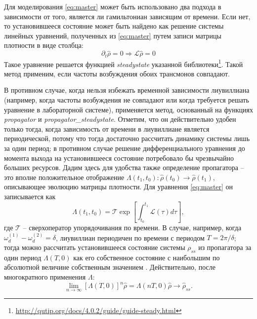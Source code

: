 \documentclass[14pt, a4paper]{extreport}
\numberwithin{equation}{section}
\begin{document}
Для моделирования \eqref{eq:master} может быть использовано два подхода в зависимости от того, является ли гамильтониан зависящим от времени. Если нет, то установившееся состояние может быть найдено как решение системы линейных уравнений, полученных из \eqref{eq:master} путем записи матрицы плотности в виде столбца:
\begin{equation}
\partial_t \hat \rho = 0  \Rightarrow \mathcal{L} 
\hat \rho = 0
\label{eq:steady}
\end{equation}
Такое уравнение решается функцией \foreignlanguage{english}{\textit{steadystate}} указанной библиотеки\footnote{\url{http://qutip.org/docs/4.0.2/guide/guide-steady.html}}. Такой метод применим, если частоты возбуждения обоих трансмонов совпадают.

В противном случае, когда нельзя избежать временной зависимости лиувиллиана (например, когда частоты возбуждения не совпадают или когда требуется решать уравнение в лабораторной системе), применяется метод, основанный на функциях \textit{propagator} и \textit{propagator\_steadystate}. Отметим, что он действительно удобен только тогда, когда зависимость от времени в лиувиллиане является периодической, потому что тогда достаточно рассчитать динамику системы лишь за один период; в противном случае решение дифференциального уравнения до момента выхода на установившееся состояние потребовало бы чрезвычайно больших ресурсов. Дадим здесь для удобства также определение пропагатора -- это вполне положительное отображение \cite{oseledets1983completely} $\Lambda(t_1, t_0): \hat \rho(t_0) \rightarrow 
\hat \rho(t_1)$, описывающее эволюцию матрицы плотности. Для уравнения \eqref{eq:master} он записывается как
\begin{equation}
\Lambda(t_1, t_0) = \mathcal{T} \exp \left[\int_{t_0}^{t_1} \mathcal L(\tau) d\tau\right],
\label{eq:propagator}
\end{equation}
где $\mathcal T$ -- сверхоператор упорядочивания по времени. В случае, например, когда $\omega_d^{(1)} - \omega_d^{(2)} = \delta$, лиувиллиан периодичен по времени с периодом $T = 2\pi/\delta$; тогда можно рассчитать установившееся состояние системы $\rho_{ss}$ из пропагатора за один период $\Lambda(T, 0)$ как его собственное состояние с наибольшим по абсолютной величине собственным значением \cite{dittrich1998quantum, rivas2012open}. Действительно, после многократного применения $\Lambda$:
\[
\lim_{n\to \infty} \left[\Lambda(T, 0)\right]^n \hat \rho = \Lambda(nT, 0) \hat \rho \to \hat \rho_{ss}.
\]
\vspace{0.5cm}
\end{document}
